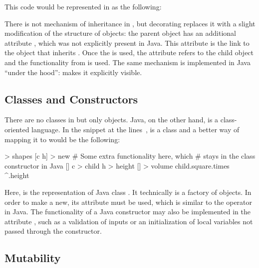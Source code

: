 This code would be represented in \eo{} as the following:


There is not mechanism of inheritance in \eo{}, but decorating replaces
it with a slight modification of the structure of objects: the parent
object  has an additional attribute , which was
not explicitly present in Java. This attribute is the link to the object
that inherits . Once the  is used, the attribute
refers to the child object and the functionality from  is used.
The same mechanism is implemented in Java ``under the hood'': \eo{}
makes it explicitly visible.

\subsection{Classes and Constructors}

There are no classes in \eo{} but only objects. Java, on the other hand,
is a class-oriented language. In the snippet
at the lines~,  is a class
and a better way of mapping it to \eo{} would be the following:

\begin{ffcode}
[] > shapes
  [c h] > new
    # Some extra functionality here, which
    # stays in the class constructor in Java
    []
      c > child
      h > height
      [] > volume
        child.square.times ^.height
\end{ffcode}

Here,  is the representation of Java class . It technically
is a factory of objects. In order to make a new, its attribute 
must be used, which is similar to the operator  in Java.
The functionality of a Java constructor may also be implemented
in the attribute , such as a validation of inputs or
an initialization of local variables not passed through the constructor.

\subsection{Mutability}


